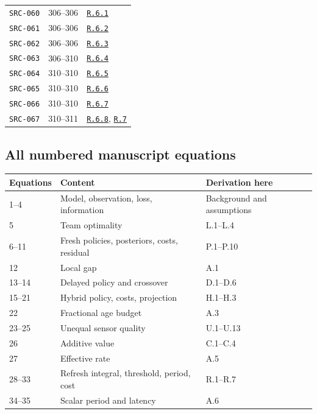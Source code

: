 \documentclass[12pt,letterpaper]{article}
\newcommand{\stepref}[1]{\hyperref[step:#1]{\texttt{#1}}}
\begin{document}
\begin{longtable}{p{.19\linewidth}p{.22\linewidth}p{.48\linewidth}}
\texttt{SRC-060} & 306--306 & \stepref{R.6.1} \\

\texttt{SRC-061} & 306--306 & \stepref{R.6.2} \\

\texttt{SRC-062} & 306--306 & \stepref{R.6.3} \\

\texttt{SRC-063} & 306--310 & \stepref{R.6.4} \\

\texttt{SRC-064} & 310--310 & \stepref{R.6.5} \\

\texttt{SRC-065} & 310--310 & \stepref{R.6.6} \\

\texttt{SRC-066} & 310--310 & \stepref{R.6.7} \\

\texttt{SRC-067} & 310--311 & \stepref{R.6.8}, \stepref{R.7} \\

\bottomrule\end{longtable}
\subsection{All numbered manuscript equations}
\begin{longtable}{p{.16\linewidth}p{.46\linewidth}p{.27\linewidth}}
\toprule Equations & Content & Derivation here \\
\midrule\endhead
1--4 & Model, observation, loss, information & Background and assumptions \\
5 & Team optimality & L.1--L.4 \\
6--11 & Fresh policies, posteriors, costs, residual & P.1--P.10 \\
12 & Local gap & A.1 \\
13--14 & Delayed policy and crossover & D.1--D.6 \\
15--21 & Hybrid policy, costs, projection & H.1--H.3 \\
22 & Fractional age budget & A.3 \\
23--25 & Unequal sensor quality & U.1--U.13 \\
26 & Additive value & C.1--C.4 \\
27 & Effective rate & A.5 \\
28--33 & Refresh integral, threshold, period, cost & R.1--R.7 \\
34--35 & Scalar period and latency & A.6 \\
\bottomrule\end{longtable}
\end{document}
